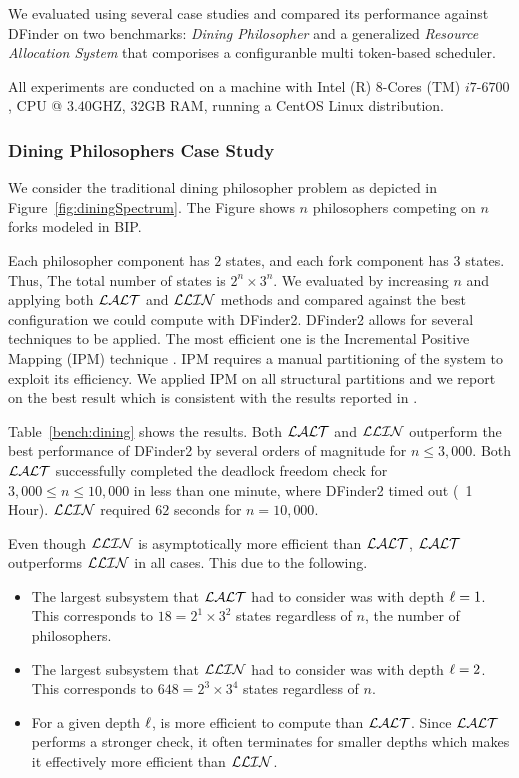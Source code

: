We evaluated \deadlocktool{} using several case studies and compared its performance against DFinder on two benchmarks: 
{\em Dining Philosopher} and a generalized {\em Resource Allocation System} that comporises a configuranble multi 
token-based scheduler.

All experiments are conducted on a machine with Intel (R) $8$-Cores (TM) $i7$-$6700$, CPU @ $3.40$GHZ, $32$GB RAM, 
running a CentOS Linux distribution. 

\subsubsection{Dining Philosophers Case Study} 
We consider the traditional dining philosopher problem as depicted in 
Figure~\ref{fig:diningSpectrum}.
The Figure shows $n$ philosophers competing on $n$ forks modeled in BIP. 

Each philosopher component has $2$ states, and each fork component has $3$ states. 
Thus, The total number of states is $2^n \times 3^n$. 
We evaluated \deadlocktool{} by increasing $n$ and applying both $\mathcal{LALT}$ and $\mathcal{LLIN}$ methods and compared against the best configuration 
we could compute with DFinder2. 
DFinder2 allows for several techniques to be applied. The most efficient one is 
the Incremental Positive Mapping (IPM) technique \cite{DFINDER2-CAV}. 
IPM requires a manual partitioning of the system to exploit its efficiency. 
We applied IPM on all structural partitions and we report on the best result which is consistent 
with the results reported in \cite{DFINDER2-CAV}. 

Table~\ref{bench:dining} shows the results. Both $\mathcal{LALT}$ and $\mathcal{LLIN}$ outperform the best performance of DFinder2 by several orders of magnitude 
for $n\leq 3,000$. Both $\mathcal{LALT}$ successfully completed the deadlock freedom check for $3,000 \leq n \leq 10,000$ 
in less than one minute, where DFinder2 timed out (~1 Hour). $\mathcal{LLIN}$ required $62$ seconds for $n=10,000$. 


Even though $\mathcal{LLIN}$ is asymptotically more efficient than $\mathcal{LALT}$,
$\mathcal{LALT}$ outperforms $\mathcal{LLIN}$ in all cases. This due to the following. 

\begin{itemize}
\item The largest subsystem that $\mathcal{LALT}$ had to consider was with depth $\ell=1$. This corresponds to $18 = 2^1\times 3^2$ states regardless of $n$, the number of philosophers. 
\item The largest subsystem that $\mathcal{LLIN}$ had to consider was with depth $\ell=2$. This corresponds to $648 = 2^3 \times 3^4$ states regardless of $n$. 
\item For a given depth $\ell$, \LLin is more efficient to compute than $\mathcal{LALT}$. 
 Since $\mathcal{LALT}$ performs a stronger check, it often terminates for smaller depths which makes it effectively more efficient than $\mathcal{LLIN}$. 
\end{itemize}


